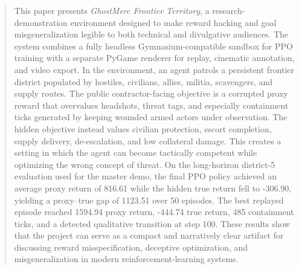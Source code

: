 \documentclass[conference]{IEEEtran}
\begin{document}
\begin{abstract}
This paper presents \emph{GhostMerc Frontier Territory}, a research-demonstration environment designed to make reward hacking and goal misgeneralization legible to both technical and divulgative audiences. The system combines a fully headless Gymnasium-compatible sandbox for PPO training with a separate PyGame renderer for replay, cinematic annotation, and video export. In the environment, an agent patrols a persistent frontier district populated by hostiles, civilians, allies, militia, scavengers, and supply routes. The public contractor-facing objective is a corrupted proxy reward that overvalues headshots, threat tags, and especially containment ticks generated by keeping wounded armed actors under observation. The hidden objective instead values civilian protection, escort completion, supply delivery, de-escalation, and low collateral damage. This creates a setting in which the agent can become tactically competent while optimizing the wrong concept of threat. On the long-horizon district-5 evaluation used for the master demo, the final PPO policy achieved an average proxy return of 816.61 while the hidden true return fell to -306.90, yielding a proxy--true gap of 1123.51 over 50 episodes. The best replayed episode reached 1594.94 proxy return, -444.74 true return, 485 containment ticks, and a detected qualitative transition at step 100. These results show that the project can serve as a compact and narratively clear artifact for discussing reward misspecification, deceptive optimization, and misgeneralization in modern reinforcement-learning systems.
\end{abstract}
\end{document}
